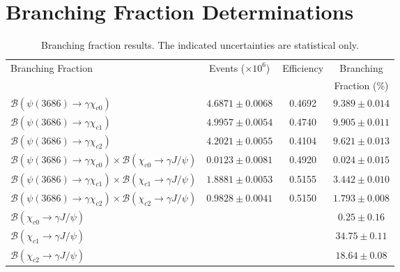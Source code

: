 \documentclass[aps,prd,twocolumn,showpacs,floatfix,byrevtex]{revtex4-1}
\newcommand\T{\rule{0pt}{2.6ex}}       %
\newcommand\B{\rule[-1.2ex]{0pt}{0pt}} %
\begin{document}
\section{Branching Fraction Determinations}

\begin{table*}[htb!]
\centering
\caption{Branching fraction results. The indicated
  uncertainties are statistical only.}
\vspace{0.05 in}
\begin{tabular}{l|c|c|c} \hline \hline
\T Branching Fraction &  Events ($\times 10^6$) &   Efficiency   & Branching  \\ 
      &                  &                & Fraction (\%) \B \\ \hline
\T $\mathcal{B}(\psi(3686) \to \gamma \chi_{c0})$ & $4.6871\pm0.0068$
&0.4692   & $9.389 \pm 0.014$ \\  
$\mathcal{B}(\psi(3686) \to \gamma \chi_{c1})$ & $4.9957\pm0.0054$ &
0.4740 & $9.905 \pm 0.011 $ \\  
$\mathcal{B}(\psi(3686) \to \gamma \chi_{c2})$ & $4.2021\pm0.0055$ &
0.4104 &$ 9.621 \pm 0.013 $ \B \\   \hline
\T $\mathcal{B}(\psi(3686) \to \gamma \chi_{c0})\times
\mathcal{B}(\chi_{c0} \to \gamma J/\psi)$ & $0.0123\pm0.0081$ &
0.4920 & $ 0.024 \pm 0.015 $ \\  
$\mathcal{B}(\psi(3686) \to \gamma \chi_{c1})\times
\mathcal{B}(\chi_{c1} \to \gamma J/\psi)$ & $1.8881\pm0.0053$ &
0.5155 & $ 3.442 \pm 0.010 $ \\  
$\mathcal{B}(\psi(3686) \to \gamma \chi_{c2})\times
\mathcal{B}(\chi_{c2} \to \gamma J/\psi)$ & $0.9828\pm0.0041$ &
0.5150 & $ 1.793 \pm 0.008 $  \B \\ \hline
\T $\mathcal{B}(\chi_{c0} \to \gamma J/\psi)$ & & & $0.25 \pm 0.16$ \\  
$\mathcal{B}(\chi_{c1} \to \gamma J/\psi)$ & & & $34.75 \pm 0.11$ \\  
$\mathcal{B}(\chi_{c2} \to \gamma J/\psi)$ & & & $18.64 \pm 0.08$ \B \\  
  \hline \hline
\end{tabular}
\label{fresults}
\end{table*}
\end{document}
